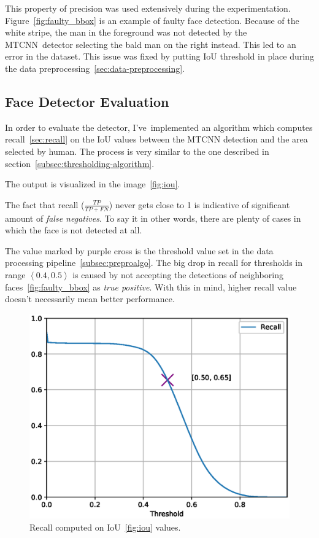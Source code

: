 This property of precision was used extensively during the experimentation.
Figure~\ref{fig:faulty_bbox} is an example of faulty face detection.
Because of the white stripe, the man in the foreground was not detected by the MTCNN detector selecting the bald man
on the right instead.
This led to an error in the dataset.
This issue was fixed by putting IoU threshold in place during the data preprocessing~\ref{sec:data-preprocessing}.

\subsection{Face Detector Evaluation}\label{subsec:detectorevaluation}
In order to evaluate the detector, I've implemented an algorithm which computes recall~\ref{sec:recall} on the IoU
values between the MTCNN detection and the area selected by human.
The process is very similar to the one described in section~\ref{subsec:thresholding-algorithm}.

The output is visualized in the image~\ref{fig:iou}.

The fact that recall ($\frac{TP}{TP+FN}$) never gets close to 1 is indicative of significant amount of
\textit{false negatives}.
To say it in other words, there are plenty of cases in which the face is not detected at all.

The value marked by purple cross is the threshold value set in the data processing pipeline~\ref{subsec:preproalgo}.
The big drop in recall for thresholds in range $\left< 0.4, 0.5 \right>$ is caused by not accepting the detections
of neighboring faces~\ref{fig:faulty_bbox} as \textit{true positive}.
With this in mind, higher recall value doesn't necessarily mean better performance.

\begin{figure}[H]
    \centering
    \includegraphics[width=0.95\columnwidth]{images/implementation/mtcnn_recall_fav-128_N1.eps}
    \caption{Recall computed on IoU~\ref{fig:iou} values.}
    \label{fig:mtcnn_recall}
\end{figure}

